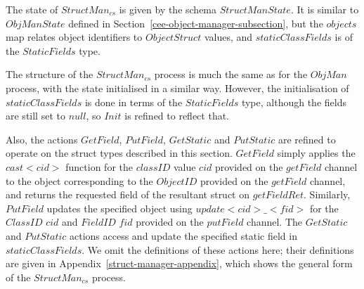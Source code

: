 The state of $StructMan_{cs}$ is given by the schema $StructManState$.
It is similar to $ObjManState$ defined in
Section~\ref{cee-object-manager-subsection}, but the $objects$ map
relates object identifiers to $ObjectStruct$ values, and
$staticClassFields$ is of the $StaticFields$ type.

The structure of the $StructMan_{cs}$ process is much the same as for
the $ObjMan$ process, with the state initialised in a similar way.
However, the initialisation of $staticClassFields$ is done in terms of
the $StaticFields$ type, although the fields are still set to $null$,
so $Init$ is refined to reflect that.

Also, the actions $GetField$, $PutField$, $GetStatic$ and $PutStatic$
are refined to operate on the struct types described in this section.
$GetField$ simply applies the $cast{<}cid{>}$ function for the
$classID$ value $cid$ provided on the $getField$ channel to the object
corresponding to the $ObjectID$ provided on the $getField$ channel,
and returns the requested field of the resultant struct on
$getFieldRet$.
Similarly, $PutField$ updates the specified object using
$update{<}cid{>}\_{<}fid{>}$ for the $ClassID$ $cid$ and $FieldID$
$fid$ provided on the $putField$ channel.
The $GetStatic$ and $PutStatic$ actions access and update the
specified static field in $staticClassFields$.
We omit the definitions of these actions here; their definitions are
given in Appendix~\ref{struct-manager-appendix}, which shows the
general form of the $StructMan_{cs}$ process.

